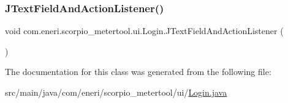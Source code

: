 \mbox{\label{classcom_1_1eneri_1_1scorpio__metertool_1_1ui_1_1_login_ac370264fc5a9cf40f743ac5342a2b7fb}} 
\subsubsection{\texorpdfstring{J\+Text\+Field\+And\+Action\+Listener()}{JTextFieldAndActionListener()}}
{\footnotesize\ttfamily void com.\+eneri.\+scorpio\+\_\+metertool.\+ui.\+Login.\+J\+Text\+Field\+And\+Action\+Listener (\begin{DoxyParamCaption}{ }\end{DoxyParamCaption})}



The documentation for this class was generated from the following file\+:\begin{DoxyCompactItemize}
\item 
src/main/java/com/eneri/scorpio\+\_\+metertool/ui/\hyperlink{_login_8java}{Login.\+java}\end{DoxyCompactItemize}
